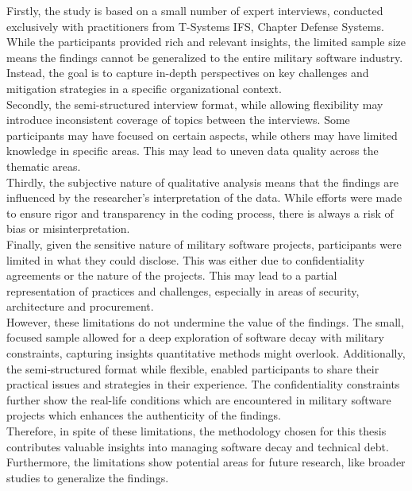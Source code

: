 Firstly, the study is based on a small number of expert interviews, conducted exclusively with practitioners from T-Systems IFS, Chapter Defense Systems. While the participants provided rich and relevant insights, the limited sample size means the findings cannot be generalized to the entire military software industry. 
Instead, the goal is to capture in-depth perspectives on key challenges and mitigation strategies in a specific organizational context.\\

Secondly, the semi-structured interview format, while allowing flexibility may introduce inconsistent coverage of topics between the interviews. Some participants may have focused on certain aspects, while others may have limited knowledge in specific areas. This may lead to uneven data quality across the thematic areas.\\

Thirdly, the subjective nature of qualitative analysis means that the findings are influenced by the researcher's interpretation of the data. While efforts were made to ensure rigor and transparency in the coding process, there is always a risk of bias or misinterpretation.\\

Finally, given the sensitive nature of military software projects, participants were limited in what they could disclose. This was either due to confidentiality agreements or the nature of the projects. This may lead to a partial representation of practices and challenges, especially in areas of security, architecture and procurement.\\

However, these limitations do not undermine the value of the findings. The small, focused sample allowed for a deep exploration of software decay with military constraints, capturing insights quantitative methods might overlook. Additionally, the semi-structured format
while flexible, enabled participants to share their practical issues and strategies in their experience. The confidentiality constraints further show the real-life conditions which are encountered in military software projects which enhances the authenticity of the findings.\\

Therefore, in spite of these limitations, the methodology chosen for this thesis contributes valuable insights into managing software decay and technical debt. Furthermore, the limitations show potential areas for future research, like broader studies to generalize the findings.

